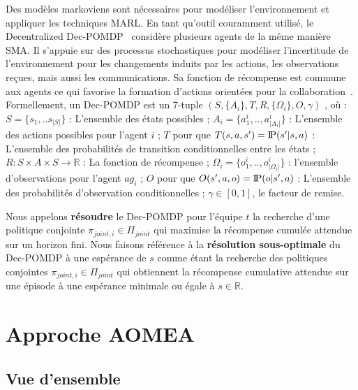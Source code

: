\documentclass[contribution]{jfsma}
\newcommand{\probP}{\text{I\kern-0.15em P}}
\begin{document}
Des modèles markoviens sont nécessaires pour modéliser l'environnement et appliquer les techniques MARL. En tant qu'outil couramment utilisé, le Decentralized Dec-POMDP~\cite{Oliehoek2016} considère plusieurs agents de la même manière SMA. Il s'appuie sur des processus stochastiques pour modéliser l'incertitude de l'environnement pour les changements induits par les actions, les observations reçues, mais aussi les communications. Sa fonction de récompense est commune aux agents ce qui favorise la formation d'actions orientées pour la collaboration~\cite{Beynier2013}. Formellement, un Dec-POMDP est un 7-tuple $(S,\{A_i\},T,R,\{\Omega_i\},O,\gamma)$ , où : $S = \{s_1, .. s_{|S|}\}$ : L'ensemble des états possibles ; $A_{i} = \{a_{1}^{i},..,a_{|A_{i}|}^{i}\}$ : L'ensemble des actions possibles pour l'agent $i$ ; $T$ pour que $T(s,a,s') = \probP{(s'|s,a)}$ : L'ensemble des probabilités de transition conditionnelles entre les états ; $R : S \times A \times S \rightarrow \mathbb{R}$ : La fonction de récompense ; $\Omega_{i} = \{o_{1}^{i},..,o_{|\Omega_{i}|}^{i}\}$ : l'ensemble d'observations pour l'agent $ag_i$ ; $O$ pour que $O(s',a,o) = \probP{(o|s',a)}$ : L'ensemble des probabilités d'observation conditionnelles ; $\gamma \in [0,1]$, le facteur de remise.

Nous appelons \textbf{résoudre} le Dec-POMDP pour l'équipe $t$ la recherche d'une politique conjointe $\pi_{joint,i} \in \Pi_{joint}$ qui maximise la récompense cumulée attendue sur un horizon fini.
Nous faisons référence à la \textbf{résolution sous-optimale} du Dec-POMDP à une espérance de $s$ comme étant la recherche des politiques conjointes $\pi_{joint,i} \in \Pi_{joint}$ qui obtiennent la récompense cumulative attendue sur une épisode à une espérance minimale ou égale à $s \in \mathbb{R}$.



\section{Approche AOMEA}



\subsection{Vue d'ensemble}
\end{document}
